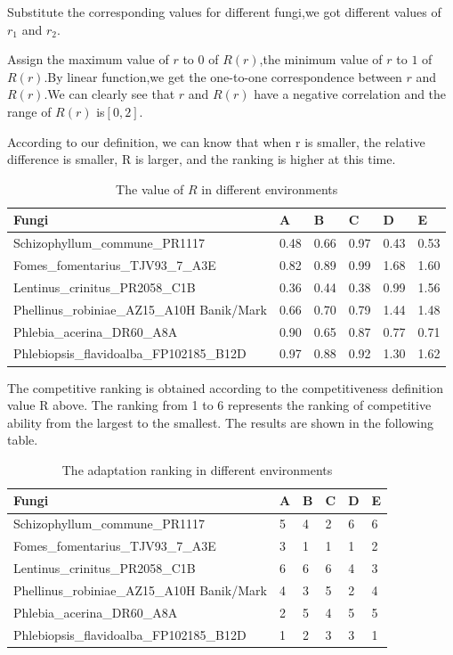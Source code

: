 \documentclass{mcmthesis}
\begin{document}
Substitute the corresponding values for different fungi,we got different values of $r_{1}$ and $r_{2}$.

Assign the maximum value of $r$ to $0$ of $R(r)$,the minimum value of $r$ to $1$ of $R(r)$.By linear function,we get the one-to-one correspondence between $r$ and $R(r)$.We can clearly see that $r$ and $R(r)$ have a negative correlation and the range of $R(r)$ is$[0,2]$.

According to our definition, we can know that when r is smaller, the relative difference is smaller, R is larger, and the ranking is higher at this time.

\begin{table}[h]
	\centering
	\caption{The value of $R$ in different environments}
	\begin{tabular}{p{}p{}p{}p{}p{}p{}}
		\hline
		Fungi & A & B & C & D & E\\
		\hline
		Schizophyllum\_commune\_PR1117 & 0.48 & 0.66 & 0.97 & 0.43 & 0.53\\
		Fomes\_fomentarius\_TJV93\_7\_A3E & 0.82 & 0.89 & 0.99 & 1.68 & 1.60\\
		Lentinus\_crinitus\_PR2058\_C1B & 0.36 & 0.44 & 0.38 & 0.99 & 1.56\\
		Phellinus\_robiniae\_AZ15\_A10H Banik/Mark & 0.66 & 0.70 & 0.79 & 1.44 & 1.48\\
		Phlebia\_acerina\_DR60\_A8A & 0.90 & 0.65 & 0.87 & 0.77 & 0.71\\
		Phlebiopsis\_flavidoalba\_FP102185\_B12D & 0.97 & 0.88 & 0.92 & 1.30 & 1.62\\
		\hline
	\end{tabular}
\end{table}

The competitive ranking is obtained according to the competitiveness definition value R above. The ranking from 1 to 6 represents the ranking of competitive ability from the largest to the smallest. The results are shown in the following table.
\begin{table}[h]
	\centering
	\caption{The adaptation ranking in different environments}
	\begin{tabular}{p{}p{}p{}p{}p{}p{}}
		\hline
		Fungi & A & B & C & D & E\\
		\hline
		Schizophyllum\_commune\_PR1117 & 5 & 4 & 2 & 6 & 6\\
		Fomes\_fomentarius\_TJV93\_7\_A3E & 3 & 1 & 1 & 1 & 2\\
		Lentinus\_crinitus\_PR2058\_C1B & 6 & 6 & 6 & 4 & 3\\
		Phellinus\_robiniae\_AZ15\_A10H Banik/Mark & 4 & 3 & 5 & 2 & 4\\
		Phlebia\_acerina\_DR60\_A8A & 2 & 5 & 4 & 5 & 5\\
		Phlebiopsis\_flavidoalba\_FP102185\_B12D & 1 & 2 & 3 & 3 & 1\\
		\hline
	\end{tabular}
\end{table}
\end{document}
